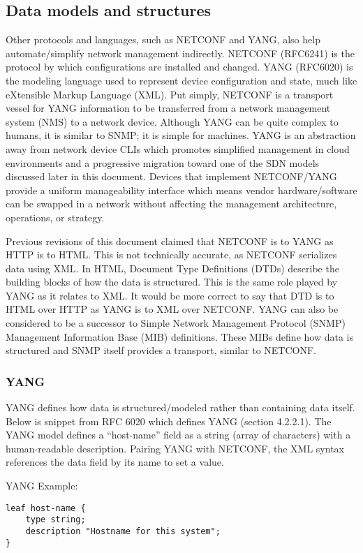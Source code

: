 \subsection{Data models and structures}
Other protocols and languages, such as NETCONF and YANG, also help
automate/simplify network management indirectly. NETCONF (RFC6241) is the
protocol by which configurations are installed and changed. YANG (RFC6020) is
the modeling language used to represent device configuration and state, much
like eXtensible Markup Language (XML). Put simply, NETCONF is a transport
vessel for YANG information to be transferred from a network management system
(NMS) to a network device. Although YANG can be quite complex to humans, it is
similar to SNMP\@; it is simple for machines. YANG is an abstraction away from
network device CLIs which promotes simplified management in cloud environments
and a progressive migration toward one of the SDN models discussed later in
this document. Devices that implement NETCONF/YANG provide a uniform
manageability interface which means vendor hardware/software can be swapped in
a network without affecting the management architecture, operations, or strategy.

Previous revisions of this document claimed that NETCONF is to YANG as HTTP is
to HTML\@. This is not technically accurate, as NETCONF serializes data using
XML\@. In HTML, Document Type Definitions (DTDs) describe the building blocks of
how the data is structured. This is the same role played by YANG as it relates
to XML\@. It would be more correct to say that DTD is to HTML over HTTP as YANG
is to XML over NETCONF\@. YANG can also be considered to be a successor to
Simple Network Management Protocol (SNMP) Management Information Base (MIB)
definitions. These MIBs define how data is structured and SNMP itself provides
a transport, similar to NETCONF\@.

\subsubsection{YANG}
YANG defines how data is structured/modeled rather than containing data
itself. Below is snippet from RFC 6020 which defines YANG (section 4.2.2.1).
The YANG model defines a ``host-name'' field as a string (array of characters)
with a human-readable description. Pairing YANG with NETCONF, the XML syntax
references the data field by its name to set a value.

YANG Example:

\begin{verbatim}
leaf host-name {
    type string;
    description "Hostname for this system";
}
\end{verbatim}

